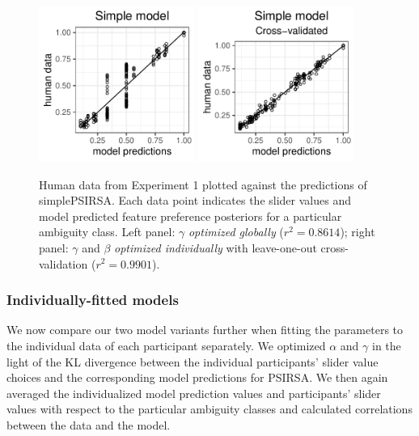 \documentclass[10pt,a4paper]{article}
\newcommand{\gcs}[1]{\textcolor{blue}{[gcs: #1]}}
\begin{document}
\begin{figure}[ht]
	\centering
	\includegraphics[width=2in]{images/m13.pdf}
	\includegraphics[width=2in]{images/m8.pdf}
		\caption{Human data from Experiment 1 plotted against the predictions of simplePSIRSA. %
		Each data point indicates the slider values and model predicted feature preference posteriors for a particular ambiguity class.
		Left panel: $\gamma$ \emph{optimized globally} ($r^2 = 0.8614$); 
		right panel: $\gamma$ and $\beta$ \emph{optimized individually} with leave-one-out cross-validation ($r^{2}=0.9901$).
	}
		\label{simple-global-and-cross-validated}
\end{figure}


\subsubsection*{Individually-fitted models}

We now compare our two model variants further when fitting the parameters to the individual data of each participant separately. 
We optimized $\alpha$ and $\gamma$ in the light of the KL divergence between the individual participants' slider value choices and the corresponding model predictions for PSIRSA.
We then again averaged the individualized model prediction values and participants' slider values with respect to the particular ambiguity classes and calculated correlations between the data and the model.
\end{document}
